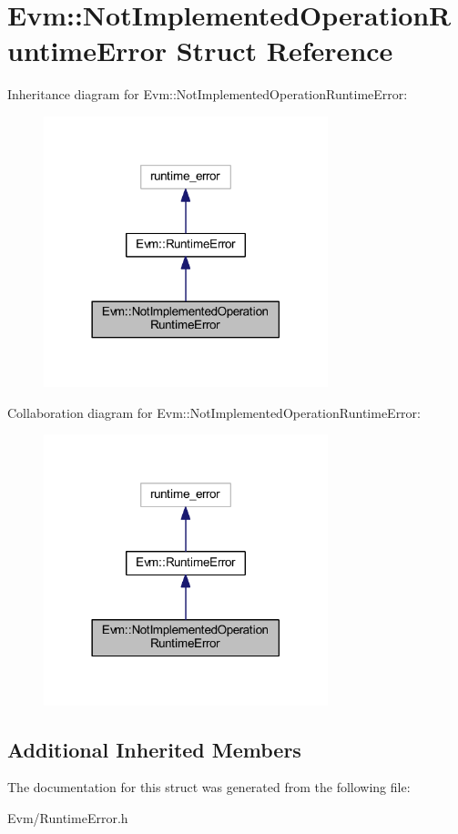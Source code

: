 \hypertarget{struct_evm_1_1_not_implemented_operation_runtime_error}{}\section{Evm\+:\+:Not\+Implemented\+Operation\+Runtime\+Error Struct Reference}
\label{struct_evm_1_1_not_implemented_operation_runtime_error}


Inheritance diagram for Evm\+:\+:Not\+Implemented\+Operation\+Runtime\+Error\+:
\nopagebreak
\begin{figure}[H]
\begin{center}
\leavevmode
\includegraphics[width=234pt]{struct_evm_1_1_not_implemented_operation_runtime_error__inherit__graph}
\end{center}
\end{figure}


Collaboration diagram for Evm\+:\+:Not\+Implemented\+Operation\+Runtime\+Error\+:
\nopagebreak
\begin{figure}[H]
\begin{center}
\leavevmode
\includegraphics[width=234pt]{struct_evm_1_1_not_implemented_operation_runtime_error__coll__graph}
\end{center}
\end{figure}
\subsection*{Additional Inherited Members}


The documentation for this struct was generated from the following file\+:\begin{DoxyCompactItemize}
\item 
Evm/Runtime\+Error.\+h\end{DoxyCompactItemize}
